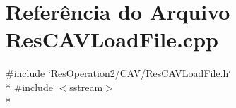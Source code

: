 \section{Referência do Arquivo Res\+C\+A\+V\+Load\+File.\+cpp}
\label{_2_c_a_v_2_res_c_a_v_load_file_8cpp}
{\ttfamily \#include \char`\"{}Res\+Operation2/\+C\+A\+V/\+Res\+C\+A\+V\+Load\+File.\+h\char`\"{}}\\*
{\ttfamily \#include $<$sstream$>$}\\*
